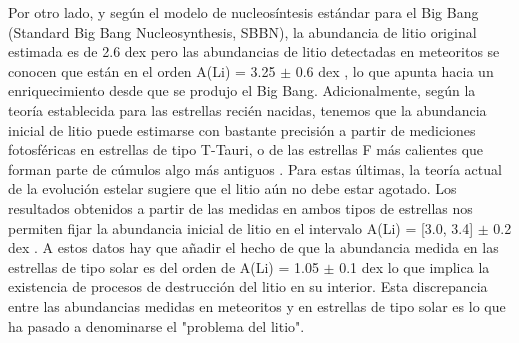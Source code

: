 Por otro lado, y según el modelo de nucleosíntesis estándar para el Big Bang (Standard Big Bang Nucleosynthesis, SBBN), la abundancia de litio original estimada es de 2.6 dex \citep{Spergel2003} pero las abundancias de litio detectadas en meteoritos se conocen que están en el orden A(Li) = 3.25 $\pm$ 0.6 dex \citep{Grevesse2007}, lo que apunta hacia un enriquecimiento desde que se produjo el Big Bang. Adicionalmente, según la teoría establecida para las estrellas recién nacidas, tenemos que la abundancia inicial de litio puede estimarse con bastante precisión a partir de mediciones fotosféricas en estrellas de tipo T-Tauri, o de las estrellas F más calientes que forman parte de cúmulos algo más antiguos \citep{Jeffries2004}. Para estas últimas, la teoría actual de la evolución estelar sugiere que el litio aún no debe estar agotado. Los resultados obtenidos a partir de las medidas en ambos tipos de estrellas nos permiten fijar la abundancia inicial de litio en el intervalo A(Li) = [3.0, 3.4] $\pm$ 0.2 dex \citep{Jeffries2004}. A estos datos hay que añadir el hecho de que la abundancia medida en las estrellas de tipo solar es del orden de A(Li) = 1.05 $\pm$ 0.1 dex \citep{Grevesse2007} lo que implica la existencia de procesos de destrucción del litio en su interior. Esta discrepancia entre las abundancias medidas en meteoritos y en estrellas de tipo solar es lo que ha pasado a denominarse el "problema del litio".\par

